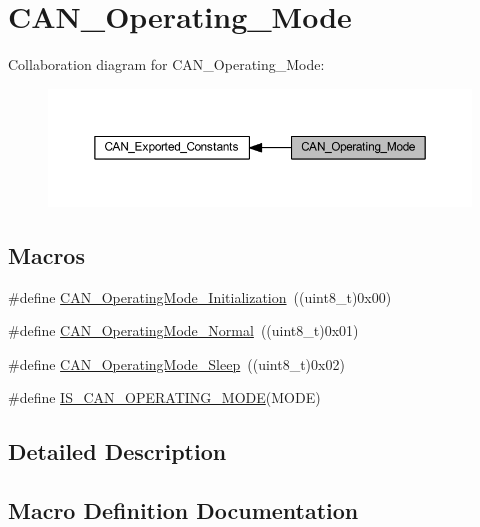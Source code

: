 \hypertarget{group___c_a_n___operating___mode}{}\section{C\+A\+N\+\_\+\+Operating\+\_\+\+Mode}
\label{group___c_a_n___operating___mode}
Collaboration diagram for C\+A\+N\+\_\+\+Operating\+\_\+\+Mode\+:
\nopagebreak
\begin{figure}[H]
\begin{center}
\leavevmode
\includegraphics[width=350pt]{group___c_a_n___operating___mode}
\end{center}
\end{figure}
\subsection*{Macros}
\begin{DoxyCompactItemize}
\item 
\#define \hyperlink{group___c_a_n___operating___mode_gace8a4b5c164aba6f473d6254ad1e8a36}{C\+A\+N\+\_\+\+Operating\+Mode\+\_\+\+Initialization}~((uint8\+\_\+t)0x00)
\item 
\#define \hyperlink{group___c_a_n___operating___mode_ga663ecffaa60d1a201a035dfa45325848}{C\+A\+N\+\_\+\+Operating\+Mode\+\_\+\+Normal}~((uint8\+\_\+t)0x01)
\item 
\#define \hyperlink{group___c_a_n___operating___mode_ga173b85d2baaa6249d966b8073e3ad8ca}{C\+A\+N\+\_\+\+Operating\+Mode\+\_\+\+Sleep}~((uint8\+\_\+t)0x02)
\item 
\#define \hyperlink{group___c_a_n___operating___mode_ga377f1598db9b0248ba83fa6e5a75db75}{I\+S\+\_\+\+C\+A\+N\+\_\+\+O\+P\+E\+R\+A\+T\+I\+N\+G\+\_\+\+M\+O\+DE}(M\+O\+DE)
\end{DoxyCompactItemize}


\subsection{Detailed Description}


\subsection{Macro Definition Documentation}
\mbox{\label{group___c_a_n___operating___mode_gace8a4b5c164aba6f473d6254ad1e8a36}} 
